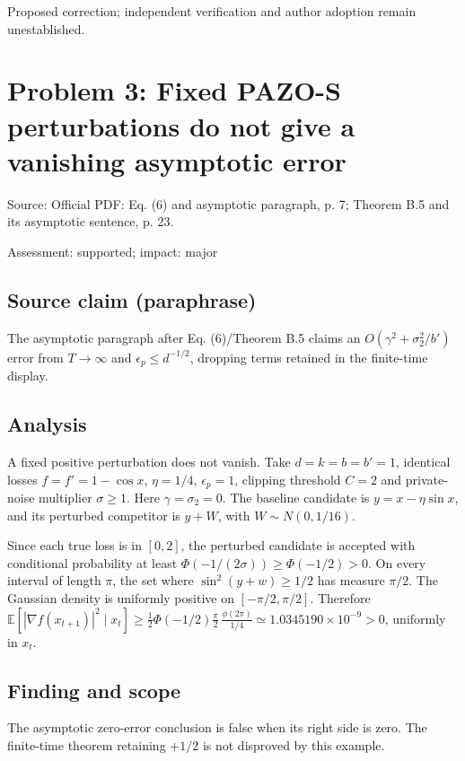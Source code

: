 \documentclass[11pt]{article}
\begin{document}
Proposed correction; independent verification and author adoption remain unestablished.

\section*{Problem 3: Fixed PAZO-S perturbations do not give a vanishing asymptotic error}

Source: Official PDF: Eq. (6) and asymptotic paragraph, p. 7; Theorem B.5 and its asymptotic sentence, p. 23.

Assessment: supported; impact: major

\subsection*{Source claim (paraphrase)}

The asymptotic paragraph after Eq. (\(6\))/Theorem B.5 claims an \(O(\gamma^2+\sigma_2^2/b')\) error from \(T\to\infty\) and \(\epsilon_p\le d^{-1/2}\), dropping terms retained in the finite-time display.

\subsection*{Analysis}

A fixed positive perturbation does not vanish. Take \(d=k=b=b'=1\), identical losses \(f=f'=1-\cos x\), \(\eta=1/4\), \(\epsilon_p=1\), clipping threshold \(C=2\) and private-noise multiplier \(\sigma\ge1\). Here \(\gamma=\sigma_2=0\). The baseline candidate is \(y=x-\eta\sin x\), and its perturbed competitor is \(y+W\), with \(W\sim N(0,1/16)\).

Since each true loss is in \([0,2]\), the perturbed candidate is accepted with conditional probability at least \(\Phi(-1/(2\sigma))\ge\Phi(-1/2)>0\). On every interval of length \(\pi\), the set where \(\sin^2(y+w)\ge1/2\) has measure \(\pi/2\). The Gaussian density is uniformly positive on \([-\pi/2,\pi/2]\). Therefore \(\mathbb E[|\nabla f(x_{t+1})|^2\mid x_t]\ge\frac12\Phi(-1/2)\frac\pi2\,\frac{\phi(2\pi)}{1/4}\simeq1.0345190\times10^{-9}>0\), uniformly in \(x_t\).

\subsection*{Finding and scope}

The asymptotic zero-error conclusion is false when its right side is zero. The finite-time theorem retaining \(+1/2\) is not disproved by this example.
\end{document}
